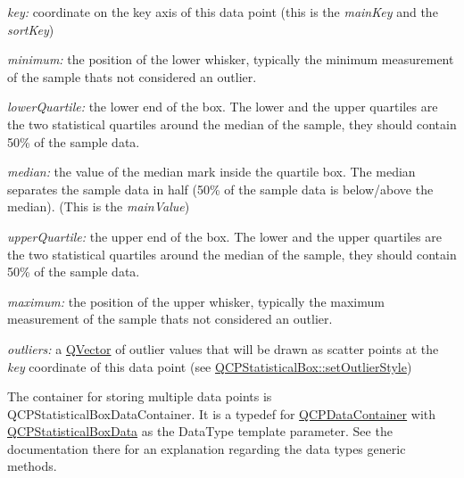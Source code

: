 \begin{DoxyItemize}
\item {\itshape key\+:} coordinate on the key axis of this data point (this is the {\itshape main\+Key} and the {\itshape sort\+Key})\end{DoxyItemize}
\begin{DoxyItemize}
\item {\itshape minimum\+:} the position of the lower whisker, typically the minimum measurement of the sample that\textquotesingle{}s not considered an outlier.\end{DoxyItemize}
\begin{DoxyItemize}
\item {\itshape lower\+Quartile\+:} the lower end of the box. The lower and the upper quartiles are the two statistical quartiles around the median of the sample, they should contain 50\% of the sample data.\end{DoxyItemize}
\begin{DoxyItemize}
\item {\itshape median\+:} the value of the median mark inside the quartile box. The median separates the sample data in half (50\% of the sample data is below/above the median). (This is the {\itshape main\+Value})\end{DoxyItemize}
\begin{DoxyItemize}
\item {\itshape upper\+Quartile\+:} the upper end of the box. The lower and the upper quartiles are the two statistical quartiles around the median of the sample, they should contain 50\% of the sample data.\end{DoxyItemize}
\begin{DoxyItemize}
\item {\itshape maximum\+:} the position of the upper whisker, typically the maximum measurement of the sample that\textquotesingle{}s not considered an outlier.\end{DoxyItemize}
\begin{DoxyItemize}
\item {\itshape outliers\+:} a \hyperlink{class_q_vector}{Q\+Vector} of outlier values that will be drawn as scatter points at the {\itshape key} coordinate of this data point (see \hyperlink{class_q_c_p_statistical_box_ad5241943422eb8e58360a97e99ad6aa7}{Q\+C\+P\+Statistical\+Box\+::set\+Outlier\+Style})\end{DoxyItemize}
The container for storing multiple data points is Q\+C\+P\+Statistical\+Box\+Data\+Container. It is a typedef for \hyperlink{class_q_c_p_data_container}{Q\+C\+P\+Data\+Container} with \hyperlink{class_q_c_p_statistical_box_data}{Q\+C\+P\+Statistical\+Box\+Data} as the Data\+Type template parameter. See the documentation there for an explanation regarding the data type\textquotesingle{}s generic methods.

